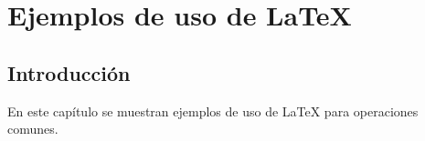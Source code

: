 \chapter{Ejemplos de uso de LaTeX}\label{cap:ejemplos}


\section{Introducción}
En este capítulo se muestran ejemplos de uso de \LaTeX{} para operaciones comunes. 







